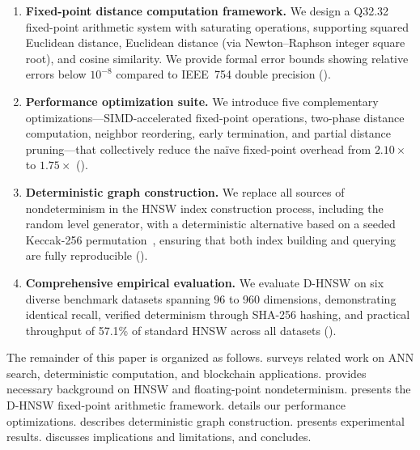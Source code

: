 \documentclass[10pt,journal,compsoc]{IEEEtran}
\newcommand{\dhnsw}{\textsc{D-HNSW}}
\newcommand{\hnsw}{\textsc{HNSW}}
\begin{document}
\begin{enumerate}[leftmargin=*]
  \item \textbf{Fixed-point distance computation framework.} We design a Q32.32 fixed-point arithmetic system with saturating operations, supporting squared Euclidean distance, Euclidean distance (via Newton--Raphson integer square root), and cosine similarity. We provide formal error bounds showing relative errors below $10^{-8}$ compared to IEEE~754 double precision ().

  \item \textbf{Performance optimization suite.} We introduce five complementary optimizations---SIMD-accelerated fixed-point operations, two-phase distance computation, neighbor reordering, early termination, and partial distance pruning---that collectively reduce the na\"ive fixed-point overhead from $2.10\times$ to $1.75\times$ ().

  \item \textbf{Deterministic graph construction.} We replace all sources of nondeterminism in the \hnsw{} index construction process, including the random level generator, with a deterministic alternative based on a seeded Keccak-256 permutation~\cite{bertoni2013keccak}, ensuring that both index building and querying are fully reproducible ().

  \item \textbf{Comprehensive empirical evaluation.} We evaluate \dhnsw{} on six diverse benchmark datasets spanning 96 to 960 dimensions, demonstrating identical recall, verified determinism through SHA-256 hashing, and practical throughput of 57.1\% of standard \hnsw{} across all datasets ().
\end{enumerate}

The remainder of this paper is organized as follows.  surveys related work on ANN search, deterministic computation, and blockchain applications.  provides necessary background on \hnsw{} and floating-point nondeterminism.  presents the \dhnsw{} fixed-point arithmetic framework.  details our performance optimizations.  describes deterministic graph construction.  presents experimental results.  discusses implications and limitations, and  concludes.


\end{document}
